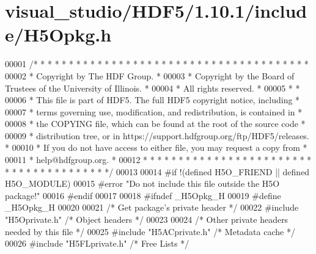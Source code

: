 \hypertarget{visual__studio_2_h_d_f5_21_810_81_2include_2_h5_opkg_8h_source}{}\section{visual\+\_\+studio/\+H\+D\+F5/1.10.1/include/\+H5\+Opkg.h}
\label{visual__studio_2_h_d_f5_21_810_81_2include_2_h5_opkg_8h_source}

\begin{DoxyCode}
00001 \textcolor{comment}{/* * * * * * * * * * * * * * * * * * * * * * * * * * * * * * * * * * * * * * *}
00002 \textcolor{comment}{ * Copyright by The HDF Group.                                               *}
00003 \textcolor{comment}{ * Copyright by the Board of Trustees of the University of Illinois.         *}
00004 \textcolor{comment}{ * All rights reserved.                                                      *}
00005 \textcolor{comment}{ *                                                                           *}
00006 \textcolor{comment}{ * This file is part of HDF5.  The full HDF5 copyright notice, including     *}
00007 \textcolor{comment}{ * terms governing use, modification, and redistribution, is contained in    *}
00008 \textcolor{comment}{ * the COPYING file, which can be found at the root of the source code       *}
00009 \textcolor{comment}{ * distribution tree, or in https://support.hdfgroup.org/ftp/HDF5/releases.  *}
00010 \textcolor{comment}{ * If you do not have access to either file, you may request a copy from     *}
00011 \textcolor{comment}{ * help@hdfgroup.org.                                                        *}
00012 \textcolor{comment}{ * * * * * * * * * * * * * * * * * * * * * * * * * * * * * * * * * * * * * * */}
00013 
00014 \textcolor{preprocessor}{#if !(defined H5O\_FRIEND || defined H5O\_MODULE)}
00015 \textcolor{preprocessor}{#error "Do not include this file outside the H5O package!"}
00016 \textcolor{preprocessor}{#endif}
00017 
00018 \textcolor{preprocessor}{#ifndef \_H5Opkg\_H}
00019 \textcolor{preprocessor}{#define \_H5Opkg\_H}
00020 
00021 \textcolor{comment}{/* Get package's private header */}
00022 \textcolor{preprocessor}{#include "H5Oprivate.h"}     \textcolor{comment}{/* Object headers           */}
00023 
00024 \textcolor{comment}{/* Other private headers needed by this file */}
00025 \textcolor{preprocessor}{#include "H5ACprivate.h"}        \textcolor{comment}{/* Metadata cache                       */}
00026 \textcolor{preprocessor}{#include "H5FLprivate.h"}    \textcolor{comment}{/* Free Lists                           */}

\end{DoxyCode}

